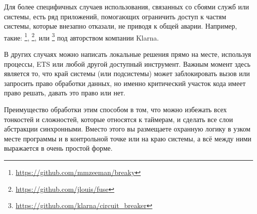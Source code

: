 Для более специфичных случаев использования, связанных со сбоями служб или системы, есть ряд приложений, помогающих ограничить доступ к частям системы, которые внезапно отказали, не приводя к общей аварии. Например, такие: \footnote{\href{https://github.com/mmzeeman/breaky}{https://github.com/mmzeeman/breaky}}, \footnote{\href{https://github.com/jlouis/fuse}{https://github.com/jlouis/fuse}},  или \footnote{\href{https://github.com/klarna/circuit\_breaker}{https://github.com/klarna/circuit\_breaker}} под авторством компании Klarna.

В других случаях можно написать локальные решения прямо на месте, используя процессы, ETS или любой другой доступный инструмент. Важным момент здесь является то, что край системы (или подсистемы) может заблокировать вызов или запросить право обработки данных, но именно критический участок кода имеет право решать, давать это право или нет.

Преимущество обработки этим способом в том, что можно избежать всех тонкостей и сложностей, которые относятся к таймерам, и сделать все слои абстракции синхронными. Вместо этого вы размещаете охранную логику в узком месте программы и в контрольной точке или на краю системы, а всё между ними выражается в очень простой форме.


